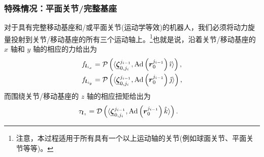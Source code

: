 \subsubsection{\normalfont\bfseries 特殊情况：平面关节/完整基座}

对于具有完整移动基座和/或平面关节(运动学等效)的机器人，我们必须将动力旋量投射到关节/移动基座的所有三个运动轴上。\footnote{注意，本过程适用于所有具有一个以上运动轴的关节(例如球面关节、平面关节等等)。}也就是说，沿着关节/移动基座的 $x$ 轴和 $y$ 轴的相应的力给出为
\begin{align*}
f_{\boldsymbol{l}_{i_{x}}} & =\operatorname{\mathcal{P}}\left(\langle\underline{\boldsymbol{\zeta}}_{0,j_{i}}^{j_{i-1}},\mathrm{Ad}\left(\boldsymbol{r}_{0}^{j_{i-1}}\right)\hat{\imath}\rangle\right),\\
f_{\boldsymbol{l}_{i_{y}}} & =\operatorname{\mathcal{P}}\left(\langle\underline{\boldsymbol{\zeta}}_{0,j_{i}}^{j_{i-1}},\mathrm{Ad}\left(\boldsymbol{r}_{0}^{j_{i-1}}\right)\hat{\jmath}\rangle\right),
\end{align*}
而围绕关节/移动基座的 $z$ 轴的相应扭矩给出为
\begin{align*}
\tau_{\boldsymbol{l}_{z}} & =\operatorname{\mathcal{D}}\left(\langle\underline{\boldsymbol{\zeta}}_{0,j_{i}}^{j_{i-1}},\mathrm{Ad}\left(\boldsymbol{r}_{0}^{j_{i-1}}\right)\hat{k}\rangle\right).
\end{align*}

%

